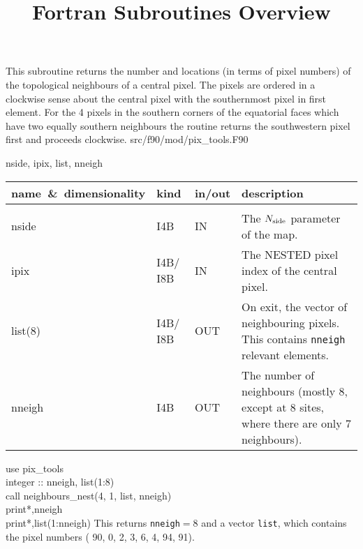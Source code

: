
\sloppy

\title{\healpix Fortran Subroutines Overview}
 \section[neighbours\_nest]{ }
\label{sub:neighbours_nest}
\author{}

\begin{facility}
{This subroutine returns the number and locations (in terms of pixel
numbers) of the topological neighbours of a central pixel. The pixels
are ordered in a clockwise sense about the central pixel with the
southernmost pixel in first element. For the 4 pixels in the southern corners of the
equatorial faces which have two equally southern neighbours the
routine returns the southwestern pixel first and proceeds clockwise.}
{src/f90/mod/pix\_tools.F90}
\end{facility}

\begin{f90format}
{nside, ipix, list, nneigh}
\end{f90format}

\begin{arguments}
{
\begin{tabular}{p{0.4\hsize} p{0.05\hsize} p{0.1\hsize} p{0.35\hsize}} \hline  
\textbf{name~\&~dimensionality} & \textbf{kind} & \textbf{in/out} & \textbf{description} \\ \hline
                   &   &   &                           \\ %
nside & I4B & IN & The ${N_{\rm side}}$ parameter of the map. \\
ipix & I4B/ I8B & IN & The NESTED pixel index of the central pixel. \\
list(8) & I4B/ I8B & OUT & On exit, the vector of neighbouring pixels. This
                   contains {\tt nneigh} relevant elements.\\
nneigh & I4B & OUT & The number of neighbours (mostly 8, except at
                   8 sites, where there are only 7 neighbours).\\
\end{tabular}
}
\end{arguments}

\begin{example}
{
use pix\_tools \\
integer :: nneigh, list(1:8) \\
call neighbours\_nest(4, 1, list, nneigh)  \\
print*,nneigh \\
print*,list(1:nneigh)
}
{
This returns {\tt nneigh}$=8$ and a vector {\tt list}, which contains the pixel
numbers ( 90,  0,  2,  3,  6,  4,  94,  91).}
\end{example}

